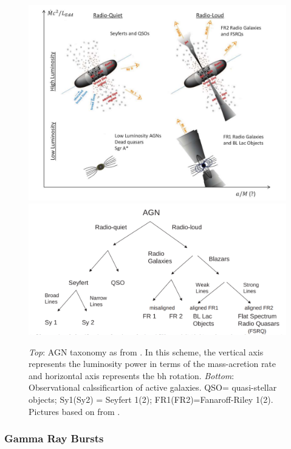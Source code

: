 \documentclass[main.tex]{subfiles}
\begin{document}
\begin{figure}
  \centering
  \includegraphics[width=\textwidth]{Pictures/schemeAGN.pdf}
  \includegraphics[width=\textwidth]{Pictures/AGNclassification.pdf}
  \caption{\textit{Top}: AGN taxonomy as from \cite{2016AGNsingammarays}. In this scheme, the vertical axis represents the luminosity power in terms of the mass-acretion rate and horizontal axis represents the \gls{bh} rotation. \textit{Bottom}: Observational calssificartion of active galaxies. QSO= quasi-stellar objects; Sy1(Sy2) = Seyfert 1(2); FR1(FR2)=Fanaroff-Riley 1(2). Pictures based on \cite{1995AGNunifiedschemes} from \cite{2016AGNsingammarays}.} 
  \label{fig:schemeAGN}
\end{figure}

\subsubsection{Gamma Ray Bursts}
\end{document}
